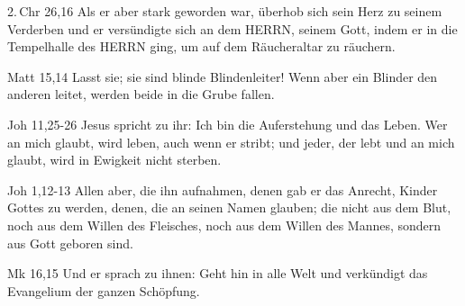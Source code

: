 \documentclass[aspectratio=43]{beamer}
\begin{document}
\begin{frame}  
    \vspace*{1cm}
        \begin{exampleblock}{2.\,Chr 26,16}
            \color{black}            
            Als er aber stark geworden war, überhob sich sein Herz zu seinem Verderben und er versündigte sich an dem HERRN, seinem Gott, indem er in die Tempelhalle des HERRN ging, um auf dem Räucheraltar zu räuchern.
        \end{exampleblock}  
    \vspace*{1cm}
\end{frame}
\begin{frame}  
    \vspace*{1cm}
        \begin{exampleblock}{Matt 15,14}
            \color{black}            
            Lasst sie; sie sind blinde Blindenleiter! Wenn aber ein Blinder den anderen leitet, werden beide in die Grube fallen.
        \end{exampleblock}  
    \vspace*{1cm}
\end{frame}
\begin{frame}  
    \vspace*{1cm}
        \begin{exampleblock}{Joh 11,25-26}
            \color{black}            
            Jesus spricht zu ihr: Ich bin die Auferstehung und das Leben. Wer an mich glaubt, wird leben, auch wenn er stribt; und jeder, der lebt und an mich glaubt, wird in Ewigkeit nicht sterben.
        \end{exampleblock}  
        \begin{exampleblock}{Joh 1,12-13}
            \color{black}            
            Allen aber, die ihn aufnahmen, denen gab er das Anrecht, Kinder Gottes zu werden, denen, die an seinen Namen glauben; die nicht aus dem Blut, noch aus dem Willen des Fleisches, noch aus dem Willen des Mannes, sondern aus Gott geboren sind.
        \end{exampleblock}  
        \begin{exampleblock}{Mk 16,15}
            \color{blue}            
            Und er sprach zu ihnen: Geht hin in alle Welt und verkündigt das Evangelium der ganzen Schöpfung.
        \end{exampleblock}  
    \vspace*{1cm}
\end{frame}
\end{document}
